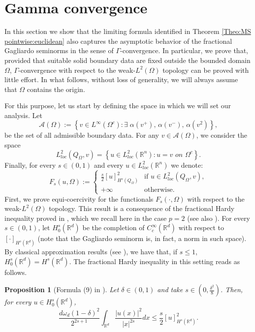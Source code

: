 \documentclass[reqno,11pt]{amsart}
\numberwithin{equation}{section}
\theoremstyle{definition} %
\theoremstyle{plain}
\newtheorem{prop}[prop]{Proposition}
\theoremstyle{definition}
\theoremstyle{remark}
\def\O{\Omega}
\def\R{\mathbb{R}}
\begin{document}
\section{Gamma convergence}\label{Sec:Gammaconv}
In this section we show that the limiting formula identified in Theorem \ref{Theo:MS pointwise:euclidean} also captures the asymptotic behavior of the fractional Gagliardo seminorms in the sense of $\Gamma$-convergence. In particular, we prove that, provided that suitable solid boundary data are fixed outside the bounded domain $\O$, $\Gamma$-convergence with respect to the weak-$L^2(\O)$ topology can be proved with little effort. In what follows, without loss of generality, we will always assume that $\Omega$ contains the origin.

For this purpose, let us start by defining the space in which we will set our analysis. 
Let
\begin{equation}
    \mathcal{A}(\O):=\left\{v\in L^\infty (\O^c):\exists\;\alpha(v^+),\, \alpha(v^-),\,\alpha(v^2)\right\},
\end{equation}
be the set of all admissible boundary data. For any $v\in\mathcal{A}(\O)$, we consider the space 
\begin{equation}
    L^2_{loc}(Q_\O,v)=\left\{u\in L^2_{loc}(\R^n):u=v\textit{ on }\O^c\right\}.
\end{equation}
Finally, for every $s\in(0,1)$ and every $u\in L^2_{loc}(\R^n)$ we denote:
\begin{equation*}
    F_s(u,\O):=\begin{cases}\frac{s}{2}[u]_{H^s(Q_\O)}^2&\text{if }u\in L^2_{loc}(Q_\O,v),\\
    +\infty&\text{otherwise}.
    \end{cases}
\end{equation*}
First, we prove equi-coercivity for the functionals $F_s(\cdot,\O)$ with respect to the weak-$L^2(\O)$ topology. This result is a consequence of the fractional Hardy inequality proved in \cite[Formula (9)]{MazyaShaposhnikova2002}, which we recall here in the case $p=2$ (see also \cite[Theorem 1.1]{CriDLKNP23}). For every $s\in(0,1)$, let $H^s_0(\R^d)$ be the completion of $C^\infty_c(\R^d)$ with respect to $[\cdot]_{H^s(\R^d)}$ (note that the Gagliardo seminorm is, in fact, a norm in such space). By classical approximation results (see \cite[Theorem 6.78]{LeoniSobolevSpaces}), we have that, if $s\leq 1$, $H^s_0(\R^d)=H^s(\R^d)$. The fractional Hardy inequality in this setting reads as follows.
\begin{prop}[Formula (9) in \cite{MazyaShaposhnikova2002}]
   \label{Theo:HardyMS02}
   Let $\delta\in(0,1)$ and take $s\in(0,\frac{\delta^2}{8})$. Then, for every $u\in H^s_0(\R^d)$,
   \begin{equation}
        \label{Eq:HardyMS}
        \frac{d\omega_d(1-\delta)^2}{2^{2s+1}}\int_{\R^d}\frac{|u(x)|^2}{|x|^{2s}}dx\leq \frac{s}{2}[u]_{H^s(\R^d)}^2.
   \end{equation}
\end{prop}
\end{document}
